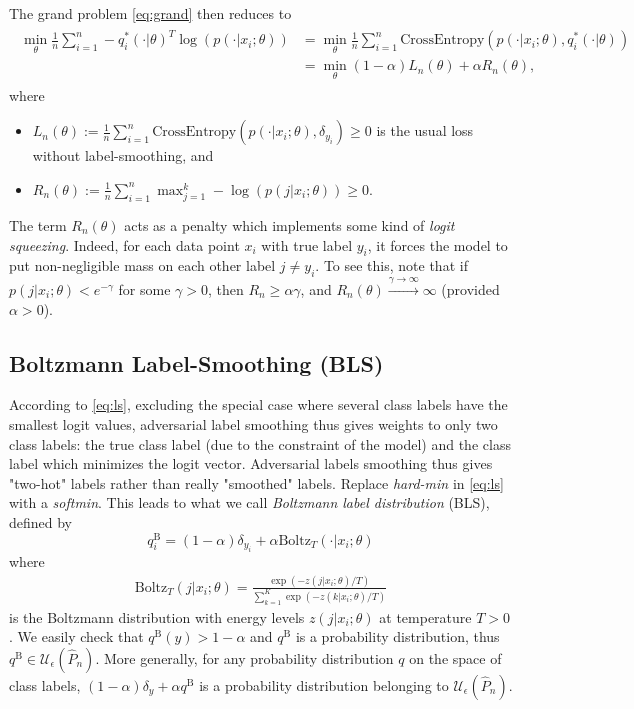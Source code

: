 The grand problem \eqref{eq:grand} then reduces to
\begin{eqnarray}
  \begin{split}
    \min_{\theta}\frac{1}{n}\sum_{i=1}^n
    -q^*_i(\cdot|\theta)^T\log(p(\cdot|x_i;\theta))&=
    \min_{\theta}\frac{1}{n}\sum_{i=1}^n
    \text{CrossEntropy}(p(\cdot|x_i;\theta),q^*_i(\cdot|\theta))\\
    &=\min_{\theta}(1-\alpha)L_n(\theta)+\alpha R_n(\theta),
    \end{split}
\end{eqnarray}
where
\begin{itemize}
  \item $L_n(\theta) :=
    \frac{1}{n}\sum_{i=1}^n\text{CrossEntropy}(p(\cdot|x_i;\theta),\delta_{y_i}) \ge 0$ is
    the usual loss without label-smoothing, and
  \item  $R_n(\theta) := \frac{1}{n}\sum_{i=1}^n\max_{j=1}^k
    -\log(p(j|x_i;\theta)) \ge 0$.
    \end{itemize}
The term $R_n(\theta)$ acts as a penalty which implements some kind of
\textit{logit squeezing}. Indeed, for each data point $x_i$ with true label
$y_i$, it forces the model to put non-negligible mass on each other label $j \ne
y_i$. To see this, note that if $p(j|x_i;\theta) < e^{-\gamma}$ for some
$\gamma > 0$, then $R_n \ge \alpha \gamma$, and $R_n(\theta) \overset{\gamma
  \rightarrow \infty}{\longrightarrow} \infty$ (provided $\alpha > 0$).


\subsection{Boltzmann Label-Smoothing (BLS)}
According to \eqref{eq:ls}, excluding the special case where several class
labels have the smallest logit values, adversarial label smoothing thus gives
weights to only two class labels: the true class label (due to the constraint of
the model) and the class label which minimizes the logit vector. Adversarial
labels smoothing thus gives "two-hot" labels rather than really "smoothed"
labels. Replace \emph{hard-min} in \eqref{eq:ls}  with a \emph{softmin}. This
leads to what we call \emph{Boltzmann label distribution} (BLS), defined
by
$$
q^{\text{B}}_i = (1- \alpha) \delta_{y_i} + \alpha \text{Boltz}_T(\cdot|x_i;\theta)
$$
where
\begin{eqnarray}
  \text{Boltz}_T(j|x_i;\theta) = \frac{\exp(-z(j|x_i;\theta)/T)}{\sum_{k=1}^K
  \exp(-z(k|x_i;\theta)/T)}
\end{eqnarray}
is the Boltzmann distribution with energy levels $z(j|x_i;\theta)$ at
temperature $T>0$.
We easily check that $q^{\text{B}}(y) > 1- \alpha$ and $q^{\text{B}}$ is a
probability distribution, thus $q^{\text{B}} \in \mathcal
U_\epsilon(\hat{P}_n)$. More generally, for any probability distribution $q$ on
the space of class labels, $(1- \alpha) \delta_y + \alpha q^{\text{B}}$ is a probability
distribution belonging to $\mathcal U_\epsilon(\hat{P}_n)$.


